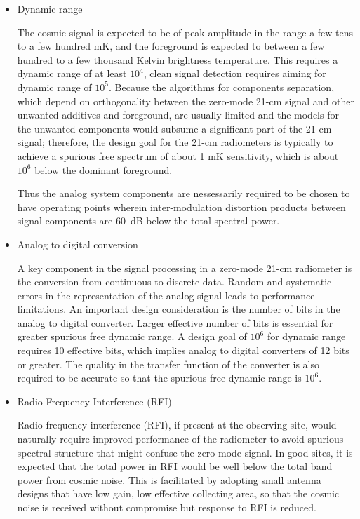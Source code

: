 \begin{itemize}
  \item 
  Dynamic range
  
  The cosmic signal is expected to be of peak amplitude in the range a few tens to a few hundred mK, and the foreground is expected to between a few hundred to a few thousand Kelvin brightness temperature.  This requires a dynamic range of at least $10^4$, clean signal detection requires aiming for dynamic range of $10^5$.  Because the algorithms for components separation, which depend on orthogonality between the zero-mode 21-cm signal and other unwanted additives and foreground, are usually limited and the models for the unwanted components would subsume a significant part of the 21-cm signal; therefore, the design goal for the 21-cm radiometers is typically to achieve a spurious free spectrum of about 1 mK sensitivity, which is about $10^6$ below the dominant foreground.
  
  Thus the analog system components are nessessarily required to be chosen to have operating points wherein inter-modulation distortion products between signal components are 60~dB below the total spectral power.
  
  \item 
  Analog to digital conversion
 
 A key component in the signal processing in a zero-mode 21-cm radiometer is the conversion from continuous to discrete data.  Random and systematic errors in the representation of the analog signal leads to performance limitations.  An important design consideration is the number of bits in the analog to digital converter.  Larger effective number of bits is essential for greater spurious free dynamic range.  A design goal of $10^6$ for dynamic range requires 10 effective bits, which implies analog to digital converters of 12 bits or greater.  The quality in the transfer function of the converter is also required to be accurate so that the spurious free dynamic range is $10^6$.
 
  \item 
  Radio Frequency Interference (RFI)
  
  Radio frequency interference (RFI), if present at the observing site, would naturally require improved performance of the radiometer to avoid spurious spectral structure that might confuse the zero-mode signal.  In good sites, it is expected that the total power in RFI would be well below the total band power from cosmic noise.  This is facilitated by adopting small antenna designs that have low gain, low effective collecting area, so that the cosmic noise is received without compromise but response to RFI is reduced. 
 

\end{itemize}
